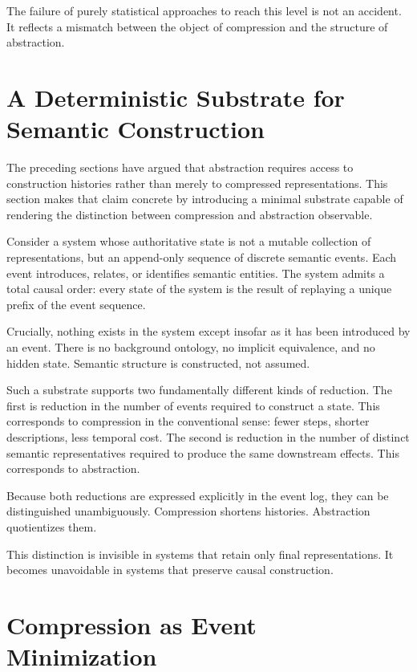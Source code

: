 \documentclass[11pt]{article}
\begin{document}
The failure of purely statistical approaches to reach this level is not an
accident. It reflects a mismatch between the object of compression and the
structure of abstraction.

\section{A Deterministic Substrate for Semantic Construction}

The preceding sections have argued that abstraction requires access to
construction histories rather than merely to compressed representations.
This section makes that claim concrete by introducing a minimal substrate
capable of rendering the distinction between compression and abstraction
observable.

Consider a system whose authoritative state is not a mutable collection
of representations, but an append-only sequence of discrete semantic
events. Each event introduces, relates, or identifies semantic entities.
The system admits a total causal order: every state of the system is the
result of replaying a unique prefix of the event sequence.

Crucially, nothing exists in the system except insofar as it has been
introduced by an event. There is no background ontology, no implicit
equivalence, and no hidden state. Semantic structure is constructed, not
assumed.

Such a substrate supports two fundamentally different kinds of reduction.
The first is reduction in the number of events required to construct a
state. This corresponds to compression in the conventional sense: fewer
steps, shorter descriptions, less temporal cost. The second is reduction
in the number of distinct semantic representatives required to produce the
same downstream effects. This corresponds to abstraction.

Because both reductions are expressed explicitly in the event log, they
can be distinguished unambiguously. Compression shortens histories.
Abstraction quotientizes them.

This distinction is invisible in systems that retain only final
representations. It becomes unavoidable in systems that preserve causal
construction.

\section{Compression as Event Minimization}
\end{document}
